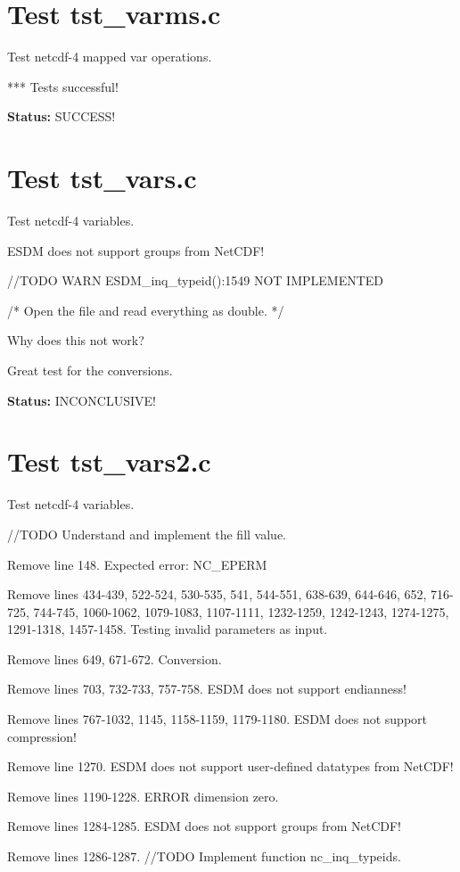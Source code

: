 \section{Test tst\_varms.c}

Test netcdf-4 mapped var operations.

*** Tests successful!

{\bf \large Status: } SUCCESS!

\section{Test tst\_vars.c}

Test netcdf-4 variables.

ESDM does not support groups from NetCDF!

//TODO WARN ESDM\_inq\_typeid():1549 NOT IMPLEMENTED

/* Open the file and read everything as double. */

Why does this not work?

Great test for the conversions.

{\bf \large Status: } INCONCLUSIVE!

\section{Test tst\_vars2.c}

Test netcdf-4 variables.

//TODO Understand and implement the fill value.

Remove line 148. Expected error: NC\_EPERM

Remove lines 434-439, 522-524, 530-535, 541, 544-551, 638-639, 644-646, 652, 716-725, 744-745, 1060-1062, 1079-1083, 1107-1111, 1232-1259, 1242-1243, 1274-1275, 1291-1318, 1457-1458. Testing invalid parameters as input.

Remove lines 649, 671-672. Conversion.

Remove lines 703, 732-733, 757-758. ESDM does not support endianness!

Remove lines 767-1032, 1145, 1158-1159, 1179-1180. ESDM does not support compression!

Remove line 1270. ESDM does not support user-defined datatypes from NetCDF!

Remove lines 1190-1228. ERROR dimension zero.

Remove lines 1284-1285. ESDM does not support groups from NetCDF!

Remove lines 1286-1287. //TODO Implement function nc\_inq\_typeids.

